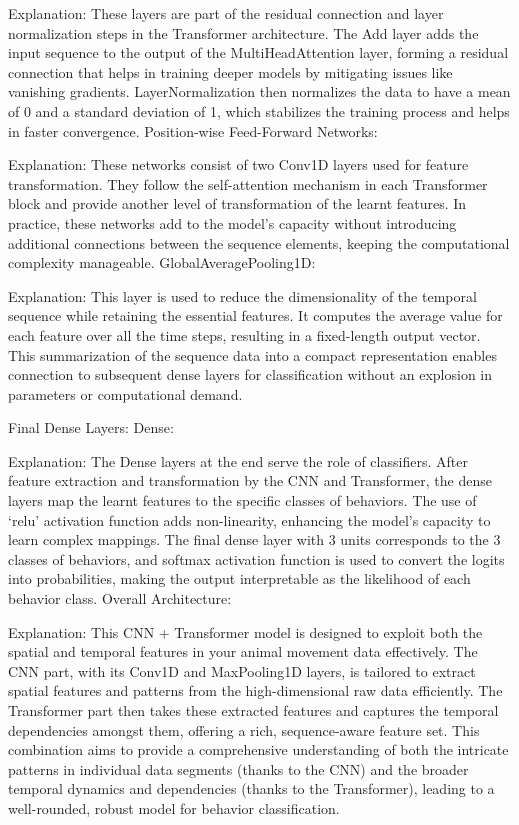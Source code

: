 Explanation: These layers are part of the residual connection and layer normalization steps in the Transformer architecture. The Add layer adds the input sequence to the output of the MultiHeadAttention layer, forming a residual connection that helps in training deeper models by mitigating issues like vanishing gradients. LayerNormalization then normalizes the data to have a mean of 0 and a standard deviation of 1, which stabilizes the training process and helps in faster convergence.
Position-wise Feed-Forward Networks:

Explanation: These networks consist of two Conv1D layers used for feature transformation. They follow the self-attention mechanism in each Transformer block and provide another level of transformation of the learnt features. In practice, these networks add to the model’s capacity without introducing additional connections between the sequence elements, keeping the computational complexity manageable.
GlobalAveragePooling1D:

Explanation: This layer is used to reduce the dimensionality of the temporal sequence while retaining the essential features. It computes the average value for each feature over all the time steps, resulting in a fixed-length output vector. This summarization of the sequence data into a compact representation enables connection to subsequent dense layers for classification without an explosion in parameters or computational demand.

Final Dense Layers:
Dense:

Explanation: The Dense layers at the end serve the role of classifiers. After feature extraction and transformation by the CNN and Transformer, the dense layers map the learnt features to the specific classes of behaviors. The use of ‘relu’ activation function adds non-linearity, enhancing the model's capacity to learn complex mappings. The final dense layer with 3 units corresponds to the 3 classes of behaviors, and softmax activation function is used to convert the logits into probabilities, making the output interpretable as the likelihood of each behavior class.
Overall Architecture:

Explanation: This CNN + Transformer model is designed to exploit both the spatial and temporal features in your animal movement data effectively. The CNN part, with its Conv1D and MaxPooling1D layers, is tailored to extract spatial features and patterns from the high-dimensional raw data efficiently. The Transformer part then takes these extracted features and captures the temporal dependencies amongst them, offering a rich, sequence-aware feature set. This combination aims to provide a comprehensive understanding of both the intricate patterns in individual data segments (thanks to the CNN) and the broader temporal dynamics and dependencies (thanks to the Transformer), leading to a well-rounded, robust model for behavior classification.




